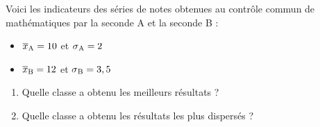 \begin{exo}
	Voici les indicateurs des séries de notes obtenues au contrôle commun de mathématiques par la seconde A et la seconde B :

	\begin{itemize}
		\item $\overline{x}\textsubscript{A} = 10$ et $\sigma\textsubscript{A} = 2$
		\item $\overline{x}\textsubscript{B} = 12$ et $\sigma\textsubscript{B} = 3,5$
	\end{itemize}

	\begin{enumerate}
		\item Quelle classe a obtenu les meilleurs résultats ?
		\item Quelle classe a obtenu les résultats les plus dispersés ?
	\end{enumerate}
\end{exo}
